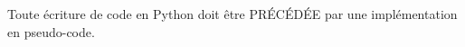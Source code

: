 

Toute écriture de code en Python doit être PR\'EC\'ED\'EE par une implémentation en pseudo-code.


